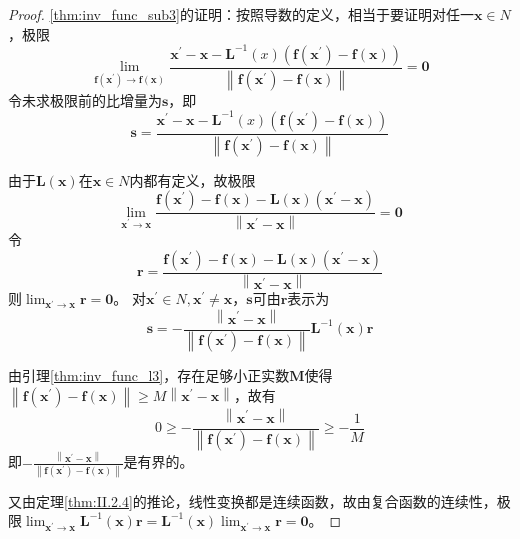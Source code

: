 \documentclass[main.tex]{subfiles}
\begin{document}
\begin{proof}
\ref{thm:inv_func_sub3}的证明：按照导数的定义，相当于要证明对任一$\mathbf{x}\in N$，极限
\[\lim_{\mathbf{f}\left(\mathbf{x}^\prime\right)\to\mathbf{f}\left(\mathbf{x}\right)}\frac{\mathbf{x}^\prime-\mathbf{x}-\mathbf{L}^{-1}\left(x\right)\left(\mathbf{f}\left(\mathbf{x}^\prime\right)-\mathbf{f}\left(\mathbf{x}\right)\right)}{\left\|\mathbf{f}\left(\mathbf{x}^\prime\right)-\mathbf{f}\left(\mathbf{x}\right)\right\|}=\mathbf{0}\]
令未求极限前的比增量为$\mathbf{s}$，即
\[\mathbf{s}=\frac{\mathbf{x}^\prime-\mathbf{x}-\mathbf{L}^{-1}\left(x\right)\left(\mathbf{f}\left(\mathbf{x}^\prime\right)-\mathbf{f}\left(\mathbf{x}\right)\right)}{\left\|\mathbf{f}\left(\mathbf{x}^\prime\right)-\mathbf{f}\left(\mathbf{x}\right)\right\|}\]

由于$\mathbf{L}\left(\mathbf{x}\right)$在$\mathbf{x}\in N$内都有定义，故极限
\[\lim_{\mathbf{x}^\prime\to\mathbf{x}}\frac{\mathbf{f}\left(\mathbf{x}^\prime\right)-\mathbf{f}\left(\mathbf{x}\right)-\mathbf{L}\left(\mathbf{x}\right)\left(\mathbf{x}^\prime-\mathbf{x}\right)}{\left\|\mathbf{x}^\prime-\mathbf{x}\right\|}=\mathbf{0}\]
令
\[\mathbf{r}=\frac{\mathbf{f}\left(\mathbf{x}^\prime\right)-\mathbf{f}\left(\mathbf{x}\right)-\mathbf{L}\left(\mathbf{x}\right)\left(\mathbf{x}^\prime-\mathbf{x}\right)}{\left\|\mathbf{x}^\prime-\mathbf{x}\right\|}\]
则$\lim_{\mathbf{x}^\prime\to\mathbf{x}}\mathbf{r}=\mathbf{0}$。
对$\mathbf{x}^\prime\in N,\mathbf{x}^\prime\neq\mathbf{x}$，$\mathbf{s}$可由$\mathbf{r}$表示为
\[
\mathbf{s}=-\frac{\left\|\mathbf{x}^\prime-\mathbf{x}\right\|}{\left\|\mathbf{f}\left(\mathbf{x}^\prime\right)-\mathbf{f}\left(\mathbf{x}\right)\right\|}\mathbf{L}^{-1}\left(\mathbf{x}\right)\mathbf{r}
\]

由引理\ref{thm:inv_func_l3}，存在足够小正实数$\mathbf{M}$使得$\left\|\mathbf{f}\left(\mathbf{x}^\prime\right)-\mathbf{f}\left(\mathbf{x}\right)\right\|\geq M\left\|\mathbf{x}^\prime-\mathbf{x}\right\|$，故有
\[0\geq-\frac{\left\|\mathbf{x}^\prime-\mathbf{x}\right\|}{\left\|\mathbf{f}\left(\mathbf{x}^\prime\right)-\mathbf{f}\left(\mathbf{x}\right)\right\|}\geq-\frac{1}{M}\]
即$-\frac{\left\|\mathbf{x}^\prime-\mathbf{x}\right\|}{\left\|\mathbf{f}\left(\mathbf{x}^\prime\right)-\mathbf{f}\left(\mathbf{x}\right)\right\|}$是有界的。

又由定理\ref{thm:II.2.4}的推论，线性变换都是连续函数，故由复合函数的连续性，极限$\lim_{\mathbf{x}^\prime\to\mathbf{x}}\mathbf{L}^{-1}\left(\mathbf{x}\right)\mathbf{r}=\mathbf{L}^{-1}\left(\mathbf{x}\right)\lim_{\mathbf{x}^\prime\to\mathbf{x}}\mathbf{r}=\mathbf{0}$。


\end{proof}
\end{document}
